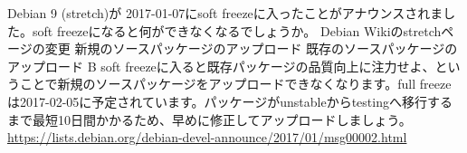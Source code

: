 %

\santaku
{Debian 9 (stretch)が 2017-01-07にsoft freezeに入ったことがアナウンスされました。soft freezeになると何ができなくなるでしょうか。}
{Debian Wikiのstretchページの変更}
{新規のソースパッケージのアップロード}
{既存のソースパッケージのアップロード}
{B}
{soft freezeに入ると既存パッケージの品質向上に注力せよ、ということで新規のソースパッケージをアップロードできなくなります。full freezeは2017-02-05に予定されています。パッケージがunstableからtestingへ移行するまで最短10日間かかるため、早めに修正してアップロードしましょう。\url{https://lists.debian.org/debian-devel-announce/2017/01/msg00002.html}}
